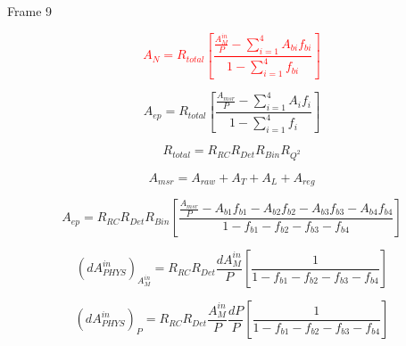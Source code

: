 \documentclass[xcolor=x11names,compress,8pt]{beamer}
\renewcommand{\(}{\begin{columns}}
\renewcommand{\)}{\end{columns}}
\newcommand{\<}[1]{\begin{column}{#1}}
\renewcommand{\>}{\end{column}}
\begin{document}
\begin{frame}{Frame 9}

\textcolor{red}{
\begin{equation} \label{equ:eqPhysicsAsymmetry211}
A_{N} = R_{total} \left[ \frac{\frac{A_{M}^{in}}{P} - \displaystyle\sum_{i=1}^{4} A_{bi}f_{bi} }{1 - \displaystyle\sum_{i=1}^{4}f_{bi}} \right] 
\end{equation}
}


\begin{equation} \label{equ:eqPhysicsAsymmetry2}
A_{ep} = R_{total} \left[ \frac{\frac{A_{msr}}{P} - \displaystyle\sum_{i=1}^{4} A_{i}f_{i} }{1 - \displaystyle\sum_{i=1}^{4}f_{i}} \right] 
\end{equation}

\pause

\begin{equation} \label{equ:eqPhysicsAsymmetry3}
R_{total} = R_{RC}R_{Det}R_{Bin}R_{Q^{2}}
\end{equation}

\begin{equation} \label{equ:eqPhysicsAsymmetry4}
A_{msr} = A_{raw} + A_{T} + A_{L} + A_{reg}
\end{equation}


\begin{equation} \label{equ:eqPhysicsAsymmetry}
A_{ep} = R_{RC}R_{Det}R_{Bin} \left[ \frac{\frac{A_{msr}}{P} - A_{b1}f_{b1} - A_{b2}f_{b2} - A_{b3}f_{b3} - A_{b4}f_{b4} }{1 - f_{b1} - f_{b2} - f_{b3} - f_{b4}} \right] 
\end{equation}


\begin{equation} \label{equ:eqdPhysicsAsymmetryAmsr}
(dA^{in}_{PHYS})_{A_{M}^{in}} = R_{RC}R_{Det} \frac{dA^{in}_{M}}{P} \left[ \frac{ 1 }{1 - f_{b1} - f_{b2} - f_{b3} - f_{b4}} \right] 
\end{equation}

\begin{equation} \label{equ:eqdPhysicsAsymmetryP}
(dA^{in}_{PHYS})_{P} = R_{RC}R_{Det} \frac{A^{in}_{M}}{P} \frac{dP}{P} \left[ \frac{ 1 }{1 - f_{b1} - f_{b2} - f_{b3} - f_{b4}} \right] 
\end{equation}


\end{frame}
\end{document}
